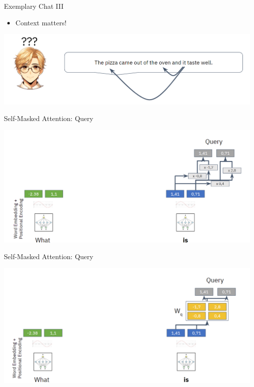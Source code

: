 \documentclass[aspectratio=169]{../latex_main/tntbeamer}  %
\begin{document}
        \begin{frame}{Exemplary Chat III}

            \begin{itemize}
                \item Context matters!
            \end{itemize}

            \centering
            \includegraphics[width=0.9\linewidth]{075_deep_learning/figures/transformer6.png}
        
        \end{frame}

        \begin{frame}{Self-Masked Attention: Query}

            \centering
            \includegraphics[width=0.9\linewidth]{075_deep_learning/figures/transformer7.png}
        
        \end{frame}

        \begin{frame}{Self-Masked Attention: Query}

            \centering
            \includegraphics[width=0.9\linewidth]{075_deep_learning/figures/transformer8.png}
        
        \end{frame}
\end{document}
